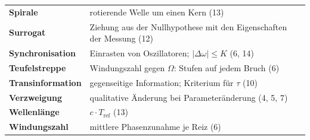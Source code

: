 \begin{merksatz}
\begin{center}
{\begin{tabular}{@{}P{3.4cm}P{5.2cm}@{}}
\textbf{Spirale} & rotierende Welle um einen Kern (13)\\
\textbf{Surrogat} & Ziehung aus der Nullhypothese mit den Eigenschaften der Messung (12)\\
\textbf{Synchronisation} & Einrasten von Oszillatoren; $|\Delta\omega| \le K$ (6, 14)\\
\textbf{Teufelstreppe} & Windungszahl gegen $\Omega$: Stufen auf jedem Bruch (6)\\
\textbf{Transinformation} & gegenseitige Information; Kriterium für $\tau$ (10)\\
\textbf{Verzweigung} & qualitative Änderung bei Parameteränderung (4, 5, 7)\\
\textbf{Wellenlänge} & $c\cdot T_{\mathrm{ref}}$ (13)\\
\textbf{Windungszahl} & mittlere Phasenzunahme je Reiz (6)\\
\bottomrule
\end{tabular}}
\end{center}
\end{merksatz}
